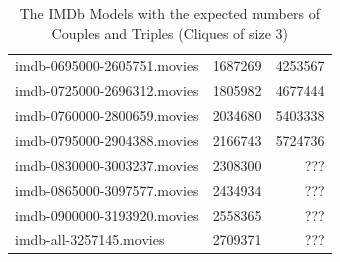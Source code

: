 \documentclass[a4paper,11pt]{article}
\begin{document}
\begin{table}[h!]
\begin{tabular}{| l | r | r |}
  imdb-0695000-2605751.movies & 1687269 & 4253567\\
  imdb-0725000-2696312.movies & 1805982 & 4677444\\
  imdb-0760000-2800659.movies & 2034680 & 5403338\\
  imdb-0795000-2904388.movies & 2166743 & 5724736\\
  imdb-0830000-3003237.movies & 2308300 & ???\\
  imdb-0865000-3097577.movies & 2434934 & ???\\
  imdb-0900000-3193920.movies & 2558365 & ???\\
  imdb-all-3257145.movies     & 2709371 & ???\\
  \hline
\end{tabular}
\caption{The IMDb Models with the expected numbers of Couples and Triples (Cliques of size 3)}
\label{tab:imdb-numbers}
\end{table}
\end{document}

